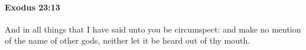 
		\paragraph{Exodus 23:13} %
			\label{EXODUS-23-13}

			And in all things that I have said unto you be circumspect: and make no mention of the name of other gods, neither let it be heard out of thy mouth.


